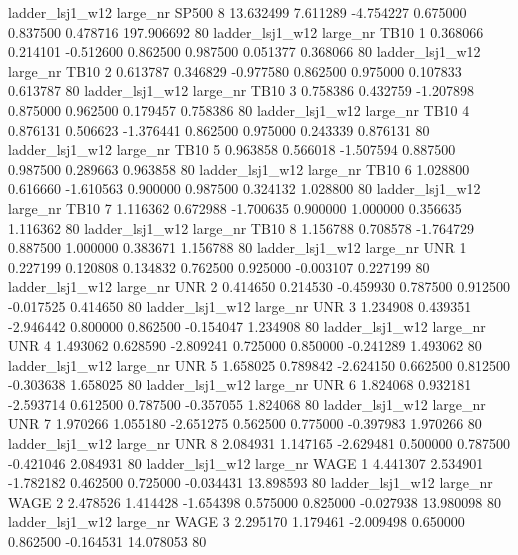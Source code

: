     ladder_lsj1_w12   large_nr    SP500                 8 13.632499  7.611289  -4.754227 0.675000 0.837500  0.478716  197.906692 80
    ladder_lsj1_w12   large_nr     TB10                 1  0.368066  0.214101  -0.512600 0.862500 0.987500  0.051377    0.368066 80
    ladder_lsj1_w12   large_nr     TB10                 2  0.613787  0.346829  -0.977580 0.862500 0.975000  0.107833    0.613787 80
    ladder_lsj1_w12   large_nr     TB10                 3  0.758386  0.432759  -1.207898 0.875000 0.962500  0.179457    0.758386 80
    ladder_lsj1_w12   large_nr     TB10                 4  0.876131  0.506623  -1.376441 0.862500 0.975000  0.243339    0.876131 80
    ladder_lsj1_w12   large_nr     TB10                 5  0.963858  0.566018  -1.507594 0.887500 0.987500  0.289663    0.963858 80
    ladder_lsj1_w12   large_nr     TB10                 6  1.028800  0.616660  -1.610563 0.900000 0.987500  0.324132    1.028800 80
    ladder_lsj1_w12   large_nr     TB10                 7  1.116362  0.672988  -1.700635 0.900000 1.000000  0.356635    1.116362 80
    ladder_lsj1_w12   large_nr     TB10                 8  1.156788  0.708578  -1.764729 0.887500 1.000000  0.383671    1.156788 80
    ladder_lsj1_w12   large_nr      UNR                 1  0.227199  0.120808   0.134832 0.762500 0.925000 -0.003107    0.227199 80
    ladder_lsj1_w12   large_nr      UNR                 2  0.414650  0.214530  -0.459930 0.787500 0.912500 -0.017525    0.414650 80
    ladder_lsj1_w12   large_nr      UNR                 3  1.234908  0.439351  -2.946442 0.800000 0.862500 -0.154047    1.234908 80
    ladder_lsj1_w12   large_nr      UNR                 4  1.493062  0.628590  -2.809241 0.725000 0.850000 -0.241289    1.493062 80
    ladder_lsj1_w12   large_nr      UNR                 5  1.658025  0.789842  -2.624150 0.662500 0.812500 -0.303638    1.658025 80
    ladder_lsj1_w12   large_nr      UNR                 6  1.824068  0.932181  -2.593714 0.612500 0.787500 -0.357055    1.824068 80
    ladder_lsj1_w12   large_nr      UNR                 7  1.970266  1.055180  -2.651275 0.562500 0.775000 -0.397983    1.970266 80
    ladder_lsj1_w12   large_nr      UNR                 8  2.084931  1.147165  -2.629481 0.500000 0.787500 -0.421046    2.084931 80
    ladder_lsj1_w12   large_nr     WAGE                 1  4.441307  2.534901  -1.782182 0.462500 0.725000 -0.034431   13.898593 80
    ladder_lsj1_w12   large_nr     WAGE                 2  2.478526  1.414428  -1.654398 0.575000 0.825000 -0.027938   13.980098 80
    ladder_lsj1_w12   large_nr     WAGE                 3  2.295170  1.179461  -2.009498 0.650000 0.862500 -0.164531   14.078053 80

